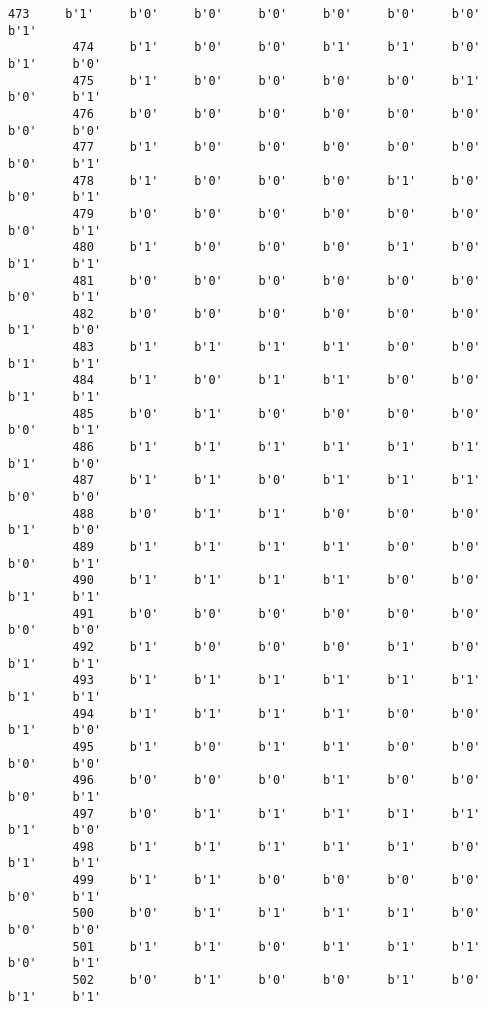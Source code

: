 \documentclass[11pt]{article}
\begin{document}
\begin{Verbatim}[commandchars=\\\{\}]
         473     b'1'     b'0'     b'0'     b'0'     b'0'     b'0'     b'0'     b'1'   
         474     b'1'     b'0'     b'0'     b'1'     b'1'     b'0'     b'1'     b'0'   
         475     b'1'     b'0'     b'0'     b'0'     b'0'     b'1'     b'0'     b'1'   
         476     b'0'     b'0'     b'0'     b'0'     b'0'     b'0'     b'0'     b'0'   
         477     b'1'     b'0'     b'0'     b'0'     b'0'     b'0'     b'0'     b'1'   
         478     b'1'     b'0'     b'0'     b'0'     b'1'     b'0'     b'0'     b'1'   
         479     b'0'     b'0'     b'0'     b'0'     b'0'     b'0'     b'0'     b'1'   
         480     b'1'     b'0'     b'0'     b'0'     b'1'     b'0'     b'1'     b'1'   
         481     b'0'     b'0'     b'0'     b'0'     b'0'     b'0'     b'0'     b'1'   
         482     b'0'     b'0'     b'0'     b'0'     b'0'     b'0'     b'1'     b'0'   
         483     b'1'     b'1'     b'1'     b'1'     b'0'     b'0'     b'1'     b'1'   
         484     b'1'     b'0'     b'1'     b'1'     b'0'     b'0'     b'1'     b'1'   
         485     b'0'     b'1'     b'0'     b'0'     b'0'     b'0'     b'0'     b'1'   
         486     b'1'     b'1'     b'1'     b'1'     b'1'     b'1'     b'1'     b'0'   
         487     b'1'     b'1'     b'0'     b'1'     b'1'     b'1'     b'0'     b'0'   
         488     b'0'     b'1'     b'1'     b'0'     b'0'     b'0'     b'1'     b'0'   
         489     b'1'     b'1'     b'1'     b'1'     b'0'     b'0'     b'0'     b'1'   
         490     b'1'     b'1'     b'1'     b'1'     b'0'     b'0'     b'1'     b'1'   
         491     b'0'     b'0'     b'0'     b'0'     b'0'     b'0'     b'0'     b'0'   
         492     b'1'     b'0'     b'0'     b'0'     b'1'     b'0'     b'1'     b'1'   
         493     b'1'     b'1'     b'1'     b'1'     b'1'     b'1'     b'1'     b'1'   
         494     b'1'     b'1'     b'1'     b'1'     b'0'     b'0'     b'1'     b'0'   
         495     b'1'     b'0'     b'1'     b'1'     b'0'     b'0'     b'0'     b'0'   
         496     b'0'     b'0'     b'0'     b'1'     b'0'     b'0'     b'0'     b'1'   
         497     b'0'     b'1'     b'1'     b'1'     b'1'     b'1'     b'1'     b'0'   
         498     b'1'     b'1'     b'1'     b'1'     b'1'     b'0'     b'1'     b'1'   
         499     b'1'     b'1'     b'0'     b'0'     b'0'     b'0'     b'0'     b'1'   
         500     b'0'     b'1'     b'1'     b'1'     b'1'     b'0'     b'0'     b'0'   
         501     b'1'     b'1'     b'0'     b'1'     b'1'     b'1'     b'0'     b'1'   
         502     b'0'     b'1'     b'0'     b'0'     b'1'     b'0'     b'1'     b'1'   

\end{Verbatim}
\end{document}
